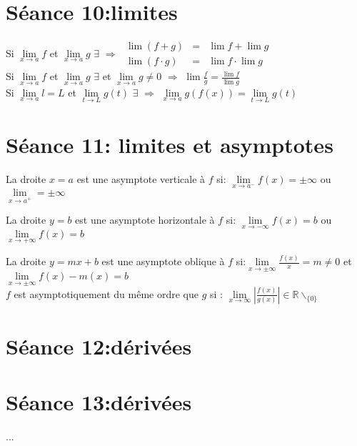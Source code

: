 \documentclass[12pt]{article}
\begin{document}
\section*{S\'eance 10:limites}
Si $\underset{x\to a}\lim f$ et $\underset{x\to a}\lim g$  $\exists$ $\Rightarrow$ 
\(
\begin{array}{lcl}
    \lim (f+g) & = & \lim f + \lim g \\
    \lim (f \cdot g) & = &  \lim f \cdot \lim g 
\end{array}\) \\ \newline
\indent Si $\underset{x\to a}\lim f$ et $\underset{x\to a}\lim g$  $\exists$ et $\underset{x\to a}\lim g \not= 0$ $\Rightarrow$ $\lim{\frac{f}{g}} = \frac{\lim{f}}{\lim{g}}$ \\ \newline
\indent Si $\underset{x\to a}\lim l = L$ et $\underset{t\to L}\lim g(t)$  $\exists$ $\Rightarrow$ $\underset{x\to a}\lim g(f(x)) = \underset{t\to L}\lim  g(t)$ \\
\section*{S\'eance 11: limites et asymptotes}
La droite $x = a$ est une asymptote verticale \`a $f$ si: $\underset{x\to a^{-}}\lim f(x) = \pm \infty$ ou $\underset{x\to a^{+}}\lim = \pm \infty$ \\ \newline

La droite $y = b$ est une asymptote horizontale \`a $f$ si: $\underset{x\to -\infty}\lim f(x) = b$ ou $\underset{x\to +\infty}\lim f(x) = b$ \\ \newline

La droite $y = mx + b$ est une asymptote oblique \`a $f$ si:\(\underset{x\to \pm \infty}\lim \frac{f(x)}{x} = m \not= 0 \) et \(\underset{x\to \pm \infty}\lim f(x)-m(x) = b \) \\ \newline
$f$ est asymptotiquement du m\^eme ordre que $g$ si : $\underset{x\to \infty}\lim |\frac{f(x)}{g(x)}| \in \mathbb{R}\backslash_{\{0\}}$
\section*{S\'eance 12:dérivées}

\section*{S\'eance 13:dérivées}
...
\end{document}
